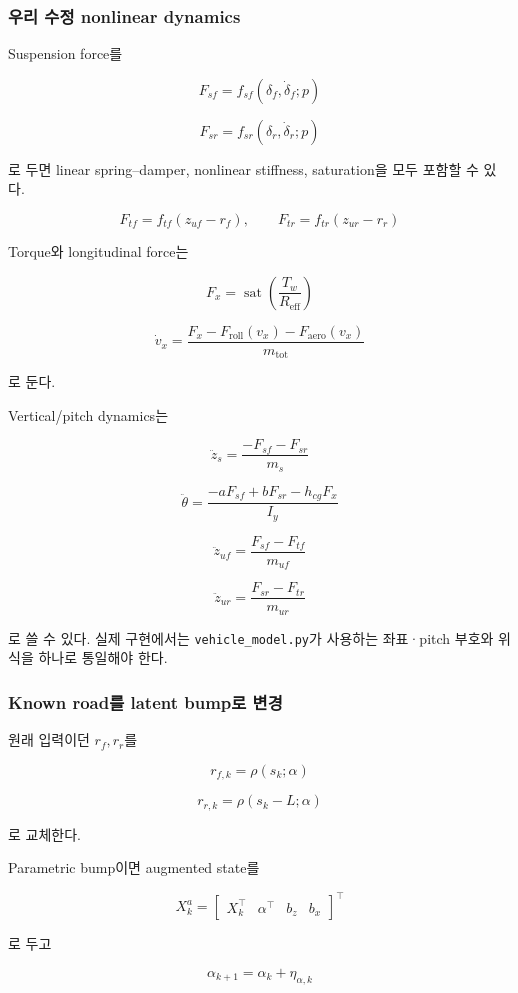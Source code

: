 \documentclass[letterpaper,10pt,journal,twocolumn]{ieeeconf}
\newcommand{\sat}{\operatorname{sat}}
\begin{document}
\subsubsection{우리 수정 nonlinear dynamics}

Suspension force를

\[
F_{sf}
=
f_{sf}
\left(
\delta_f,\dot\delta_f;p
\right)
\]

\[
F_{sr}
=
f_{sr}
\left(
\delta_r,\dot\delta_r;p
\right)
\]

로 두면 linear spring--damper, nonlinear stiffness, saturation을 모두 포함할 수 있다.

\[
F_{tf}
=
f_{tf}(z_{uf}-r_f),
\qquad
F_{tr}
=
f_{tr}(z_{ur}-r_r)
\]

Torque와 longitudinal force는

\[
F_x
=
\sat
\left(
\frac{T_w}{R_{\mathrm{eff}}}
\right)
\]

\[
\dot v_x
=
\frac{
F_x-F_{\mathrm{roll}}(v_x)-F_{\mathrm{aero}}(v_x)
}{m_{\mathrm{tot}}}
\]

로 둔다.

Vertical/pitch dynamics는

\[
\ddot z_s
=
\frac{-F_{sf}-F_{sr}}{m_s}
\]

\[
\ddot\theta
=
\frac{-aF_{sf}+bF_{sr}-h_{cg}F_x}{I_y}
\]

\[
\ddot z_{uf}
=
\frac{F_{sf}-F_{tf}}{m_{uf}}
\]

\[
\ddot z_{ur}
=
\frac{F_{sr}-F_{tr}}{m_{ur}}
\]

로 쓸 수 있다. 실제 구현에서는 \texttt{vehicle\_model.py}가 사용하는 좌표·pitch 부호와 위 식을 하나로 통일해야 한다.

\subsubsection{Known road를 latent bump로 변경}

원래 입력이던 \(r_f,r_r\)를

\[
r_{f,k}
=
\rho(s_k;\alpha)
\]

\[
r_{r,k}
=
\rho(s_k-L;\alpha)
\]

로 교체한다.

Parametric bump이면 augmented state를

\[
X_k^a
=
\begin{bmatrix}
X_k^\top&\alpha^\top&b_z&b_x
\end{bmatrix}^{\top}
\]

로 두고

\[
\alpha_{k+1}
=
\alpha_k+\eta_{\alpha,k}
\]
\end{document}
